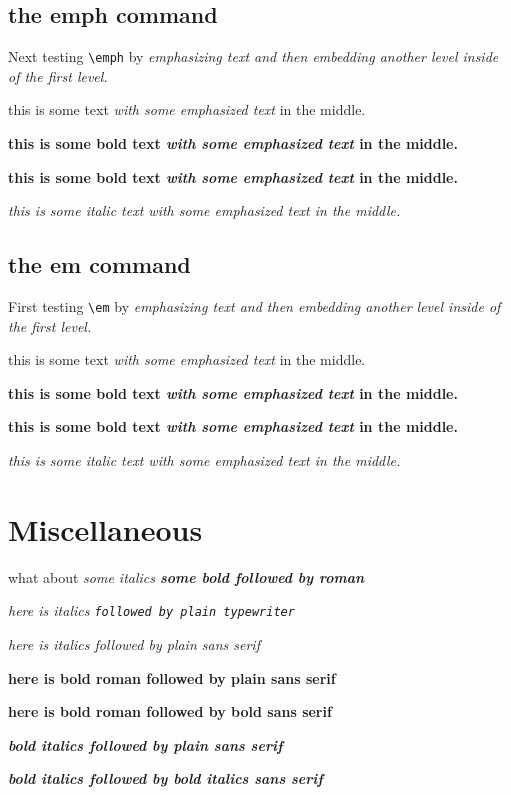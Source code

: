 ﻿\documentclass{article}
\begin{document}
\subsection{the emph command}

Next testing \verb#\emph# by \emph{emphasizing text and then \emph{embedding another
level inside} of the first level.}

this is some text \emph{with some emphasized text} in the middle.

{\bf this is some bold text \emph{with some emphasized text} in the middle.}

\textbf{this is some bold text \emph{with some emphasized text} in the middle.}

\textit{this is some italic text \emph{with some emphasized text} in the middle.}

\subsection{the em command}

First testing \verb#\em# by {\em emphasizing text and then {\em embedding another
level inside} of the first level.}

this is some text {\em with some emphasized text} in the middle.

{\bf this is some bold text {\em with some emphasized text} in the middle.}

\textbf{this is some bold text {\em with some emphasized text} in the middle.}

\textit{this is some italic text {\em with some emphasized text} in the middle.}

\section{Miscellaneous}
what about \it some italics \bf some bold \rm followed by roman

{\it here is italics \tt followed by plain typewriter}

{\it here is italics \sf followed by plain sans serif}

\textbf{here is bold roman \sf followed by plain sans serif}

{\bf here is bold roman \textsf{followed by bold sans serif}}

\textbf{\textit{bold italics \sf followed by plain sans serif}}

\textbf{\textit{bold italics \textsf{followed by bold italics sans serif}}}
\end{document}
